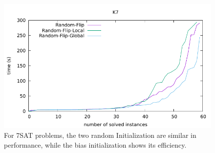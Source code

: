 \documentclass[12pt,a4paper,twoside]{scrartcl}
\numberwithin{equation}{section}
\begin{document}
  \begin{figure}[H]
\begin{center}
  \includegraphics[scale = 1]{DATA/K7/e3r.pdf}
  \end{center}
  \caption{For 7SAT problems, the two random Initialization are similar in performance, while the bias initialization shows its efficiency.}
  \label{Experiment 5 k7-r cactus plot}
  \end{figure}
\end{document}

